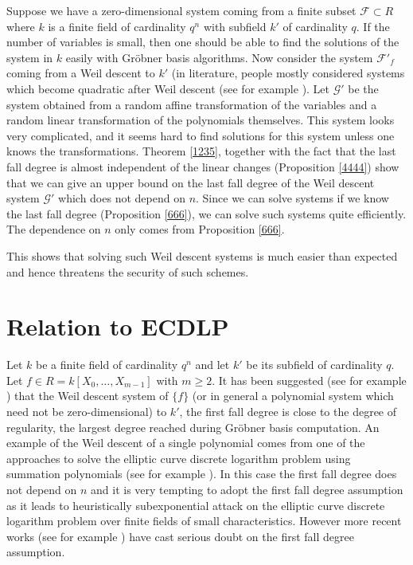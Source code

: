 \documentclass{amsart}
\theoremstyle{plain}
\theoremstyle{definition}
\begin{document}
Suppose we have a zero-dimensional system coming from a finite subset $\mathcal{F} \subset R$ where $k$ is a finite field of cardinality $q^n$ with subfield $k'$ of cardinality $q$. If the number of variables is small, then one should be able to find the solutions of the system in $k$ easily with Gr\"obner basis algorithms. Now consider the system $\mathcal{F}'_f$ coming from a Weil descent to $k'$ (in literature, people mostly considered systems which become quadratic after Weil descent (see for example \cite{BET}). Let $\mathcal{G}'$ be the system obtained from a random affine transformation of the variables and a random linear transformation of the polynomials themselves. This system looks very complicated, and it seems hard to find solutions for this system unless one knows the transformations. Theorem \ref{1235}, together with the fact that the last fall degree is almost independent of the linear changes (Proposition \ref{4444}) show that we can give an upper bound on the last fall degree of the Weil descent system $\mathcal{G}'$ which does not depend on $n$. Since we can solve systems if we know the last fall degree (Proposition \ref{666}), we can solve such systems quite efficiently. The dependence on $n$ only comes from Proposition \ref{666}. 

This shows that solving such Weil descent systems is much easier than expected and hence threatens the security of such schemes.

\section{Relation to ECDLP} \label{230}

Let $k$ be a finite field of cardinality $q^n$ and let $k'$ be its subfield of cardinality $q$. Let $f \in R=k[X_0,\ldots,X_{m-1}]$ with $m \geq 2$. It has been suggested (see for example \cite{PET}) that the Weil descent system of $\{f \}$ (or in general a polynomial system which need not be zero-dimensional) to $k'$, the first fall degree is close to the degree of regularity, the largest degree reached during Gr\"{o}bner basis computation.  An example of the Weil descent of a single polynomial  comes from one of the approaches to solve the elliptic curve discrete logarithm problem using summation polynomials (see for example \cite{DIE}). In this case the first fall degree does not depend on $n$ and it is very tempting to adopt the first fall degree assumption as it leads to heuristically subexponential attack on the elliptic curve discrete logarithm problem over finite fields of small characteristics.  However more recent works (see for example \cite{KO14}) have cast serious doubt on the first fall degree assumption.
\end{document}
